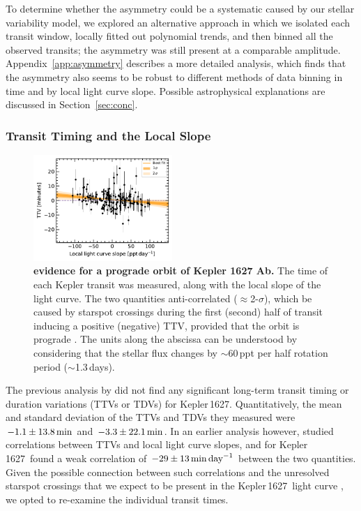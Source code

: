 \documentclass[12pt,modern,twocolumn,tighten]{aastex63}
\newcommand{\sn}{Kepler\,1627} %
\begin{document}
To determine whether the asymmetry could be a systematic caused by our
stellar variability model, we explored an alternative approach in
which we isolated each transit window, locally fitted out
polynomial trends, and then binned all the observed transits; the
asymmetry was still present at a comparable amplitude.
Appendix~\ref{app:asymmetry} describes a more detailed analysis, which finds
that the asymmetry also seems to be robust to different methods of
data binning in time and by local light curve slope.  Possible
astrophysical explanations are discussed in Section~\ref{sec:conc}.

\subsubsection{Transit Timing and the Local Slope}
\label{subsec:ttvslope}

\begin{figure}[tp]
	\begin{center}
		\leavevmode
		\includegraphics[width=0.47\textwidth]{f6.pdf}
	\end{center}
	\vspace{-0.6cm}
	\caption{
    {\bf {} evidence for a prograde orbit of Kepler 1627 Ab.} The time of
    each Kepler transit was measured, along with the local slope of
    the light curve.  The two quantities  anti-correlated
    ($\approx$2-$\sigma$), which
     be caused by starspot crossings during the first
    (second) half of transit inducing a positive (negative) TTV,
    provided that the orbit is prograde \citep{mazeh_time_2015}.  The
    units along the abscissa can be understood by considering that the
    stellar flux changes by $\sim$60\,ppt per half rotation period
    ($\sim$1.3\,days).
		\label{fig:corr}
	}
\end{figure}


The previous analysis by \citet{holczer_transit_2016} did not
find any significant long-term transit timing or duration variations
(TTVs or TDVs) for \sn.  Quantitatively, the mean and standard deviation of the
TTVs and TDVs they measured were $-1.1\pm13.8\,{\rm
min}$ and $-3.3\pm22.1\,{\rm min}$.  In an
earlier analysis however, \citet{holczer_time_2015} studied correlations
between TTVs and local light curve slopes, and for \sn\
found a weak correlation of $-29\pm13\,{\rm min}\,{\rm day}^{-1}$
between the two quantities.  Given the possible connection between such
correlations and the unresolved starspot crossings that we expect to
be present in the \sn\ light curve \citep{mazeh_time_2015}, we opted to re-examine the
individual transit times.
\end{document}

